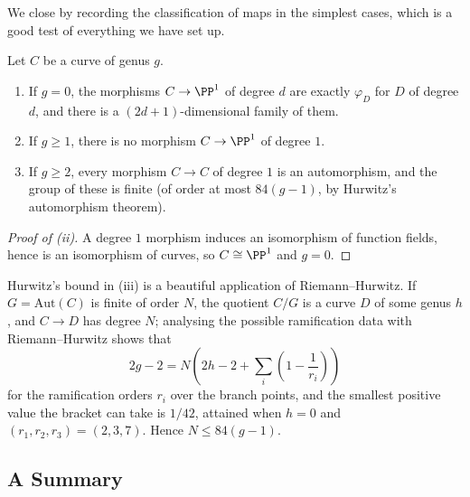 We close by recording the classification of maps in the simplest cases, which is a good test of everything we have set up.

\begin{proposition}
	Let $C$ be a curve of genus $g$.
	\begin{enumerate}[label=(\roman*)]
		\item If $g = 0$, the morphisms $C \to \PP^1$ of degree $d$ are exactly $\varphi_D$ for $D$ of degree $d$, and there is a $(2d+1)$-dimensional family of them.
		\item If $g \geq 1$, there is no morphism $C \to \PP^1$ of degree $1$.
		\item If $g\geq 2$, every morphism $C\to C$ of degree $1$ is an automorphism, and the group of these is finite (of order at most $84(g-1)$, by Hurwitz's automorphism theorem).
	\end{enumerate}
\end{proposition}

\begin{proof}[Proof of (ii)]
	A degree $1$ morphism induces an isomorphism of function fields, hence is an isomorphism of curves, so $C\cong\PP^1$ and $g = 0$.
\end{proof}

\begin{remark}
	Hurwitz's bound in (iii) is a beautiful application of Riemann--Hurwitz. If $G = \mathrm{Aut}(C)$ is finite of order $N$, the quotient $C/G$ is a curve $D$ of some genus $h$, and $C \to D$ has degree $N$; analysing the possible ramification data with Riemann--Hurwitz shows that
	$$2g-2 = N\left(2h - 2 + \sum_{i}\left(1 - \frac{1}{r_i}\right)\right)$$
	for the ramification orders $r_i$ over the branch points, and the smallest positive value the bracket can take is $1/42$, attained when $h = 0$ and $(r_1,r_2,r_3) = (2,3,7)$. Hence $N \leq 84(g-1)$.
\end{remark}

\subsection{A Summary}

